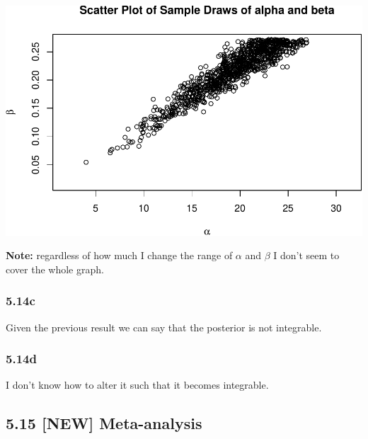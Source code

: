 \documentclass[]{article}
\begin{document}
\includegraphics{Untitled_files/figure-latex/unnamed-chunk-27-1.pdf}

\textbf{Note:} regardless of how much I change the range of \(\alpha\)
and \(\beta\) I don't seem to cover the whole graph.

\subsubsection{5.14c}\label{c-4}

Given the previous result we can say that the posterior is not
integrable.

\subsubsection{5.14d}\label{d-3}

I don't know how to alter it such that it becomes integrable.

\subsection{\texorpdfstring{5.15 \textbf{{[}NEW{]}}
Meta-analysis}{5.15 {[}NEW{]} Meta-analysis}}\label{new-meta-analysis}
\end{document}
